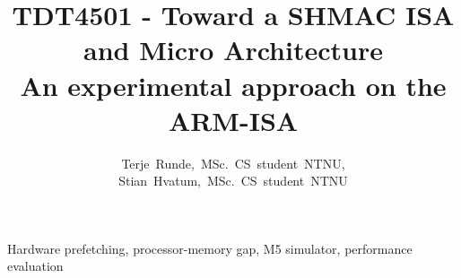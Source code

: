 \documentclass[journal]{IEEEtran}
\begin{document}
\title{\small{TDT4501 - Toward a SHMAC ISA and Micro Architecture}\\\Huge{An experimental approach on the ARM-ISA}}

\author{Terje~Runde,~MSc.~CS~student~NTNU,
        Stian~Hvatum,~MSc.~CS~student~NTNU}

\maketitle



\begin{IEEEkeywords}
Hardware prefetching, processor-memory gap, M5 simulator, performance evaluation
\end{IEEEkeywords}











\end{document}
